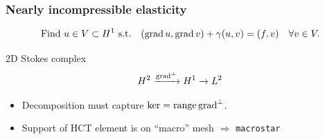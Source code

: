 \documentclass[presentation,aspectratio=43, 10pt]{beamer}
\DeclareMathOperator{\grad}{grad}
\let\div\relax
\DeclareMathOperator{\div}{div}
\DeclareMathOperator{\range}{range}
\begin{document}
\begin{frame}[fragile,t]
  \frametitle{Nearly incompressible elasticity {\footnotesize \parencite{Farrell:2020}}}
  \vspace*{-1.5\baselineskip}
  \begin{equation*}
    \text{Find $u \in V \subset H^1$ s.t.} \quad (\grad u, \grad v) + \gamma (\div u, \div v) = (f, v) \quad \forall v \in V.
  \end{equation*}
  \vspace*{-\baselineskip}
  \begin{block}{2D Stokes complex}
    \begin{equation*}
      H^2 \xrightarrow{\grad^\perp} H^1 \xrightarrow{\div} L^2
    \end{equation*}
    \vspace*{-\baselineskip}
    \begin{center}
      
    \end{center}
    \begin{itemize}
    \item Decomposition must capture $\ker \div = \range \grad^\perp$.
    \item Support of HCT element is on ``macro'' mesh $\Rightarrow$ \texttt{macrostar}
    \end{itemize}
  \end{block}
\end{frame}
\end{document}
